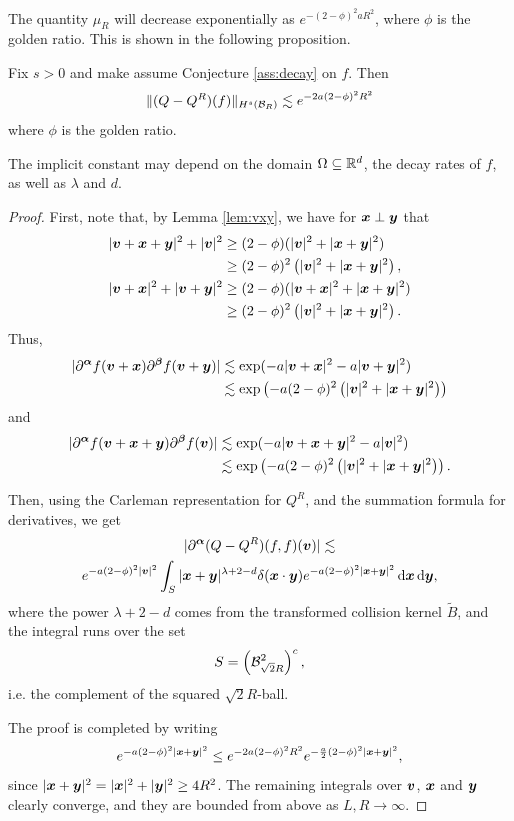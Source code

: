 The quantity $\mu_R$ will decrease exponentially as $e^{-(2-\phi)^2aR^2}$, where
$\phi$ is the golden ratio. This is shown in the following proposition.
\begin{proposition} \label{prop:QRconv}
    Fix $s>0$ and make assume Conjecture \ref{ass:decay} on $f$. Then
    \[
        \|(Q-Q^R)(f)\|_{H^s(\mathcal{B}_R)} \lesssim e^{-2a(2-\phi)^2R^2}
    \]
    where $\phi$ is the golden ratio. 
    
    The implicit constant may depend on the domain $\Omega\subseteq\mathbb{R}^d$, the
    decay rates of $f$, as well as $\lambda$ and $d$.
\end{proposition}
\begin{proof}
    First, note that, by Lemma \ref{lem:vxy}, we have for ${\bm x}\perp{\bm y}$ that
    \begin{align*}
        |{\bm v}+{\bm x}+{\bm y}|^2+|{\bm v}|^2 & \geq (2-\phi)(|{\bm v}|^2+|{\bm x}+{\bm y}|^2) \\
                & \geq (2-\phi)^2\left(|{\bm v}|^2 + |{\bm x}+{\bm y}|^2\right), \\
        |{\bm v}+{\bm x}|^2+|{\bm v}+{\bm y}|^2 & \geq
                (2-\phi)(|{\bm v}+{\bm x}|^2+|{\bm x}+{\bm y}|^2) \\
                & \geq (2-\phi)^2\left(|{\bm v}|^2 + |{\bm x}+{\bm y}|^2\right).
    \end{align*}
    Thus,
    \begin{align*}
        |\partial^{\bm\alpha} f({\bm v}+{\bm x}) \partial^{\bm\beta} f({\bm v}+{\bm y})| 
                &\lesssim \exp(-a|{\bm v}+{\bm x}|^2-a|{\bm v}+{\bm y}|^2) \\
                &\lesssim \exp\left(-a(2-\phi)^2\left(|{\bm v}|^2 + |{\bm x}+{\bm y}|^2\right)\right)
    \end{align*}
    and
    \begin{align*}
        |\partial^{\bm\alpha} f({\bm v}+{\bm x}+{\bm y}) \partial^{\bm\beta} f({\bm v})| 
                &\lesssim \exp(-a|{\bm v}+{\bm x}+{\bm y}|^2-a|{\bm v}|^2) \\
                &\lesssim \exp\left(-a(2-\phi)^2\left(|{\bm v}|^2 + |{\bm x}+{\bm y}|^2\right)\right).
    \end{align*}

    Then, using the Carleman representation for $Q^R$, and the summation
    formula for derivatives, we get
    \begin{multline*}
        |\partial^{\bm\alpha}(Q-Q^R)(f,f)({\bm v})| \lesssim  \\
                e^{-a(2-\phi)^2|{\bm v}|^2}\int_S 
                |{\bm x}+{\bm y}|^{\lambda+2-d} \delta({\bm x}\cdot{\bm y})
                e^{-a(2-\phi)^2|{\bm x}+{\bm y}|^2} \,\mathrm{d}{\bm x} \,\mathrm{d}{\bm y},
    \end{multline*}
    where the power $\lambda+2-d$ comes from the transformed collision kernel
    $\tilde{B}$, and the integral runs over the set
    \[
        S = \left(\mathcal{B}_{\sqrt{2}R}^2\right)^c,
    \]
    i.e. the complement of the squared $\sqrt{2}R$-ball.

    The proof is completed by writing
    \[
        e^{-a(2-\phi)^2|{\bm x}+{\bm y}|^2} \leq e^{-2a(2-\phi)^2R^2} 
                e^{-\frac{a}{2}(2-\phi)^2|{\bm x}+{\bm y}|^2},
    \]
    since $|{\bm x}+{\bm y}|^2=|{\bm x}|^2+|{\bm y}|^2\geq 4R^2$. The remaining integrals
    over ${\bm v}$, ${\bm x}$ and ${\bm y}$ clearly converge, and they are bounded from
    above as $L,R\to\infty$.
\end{proof}


